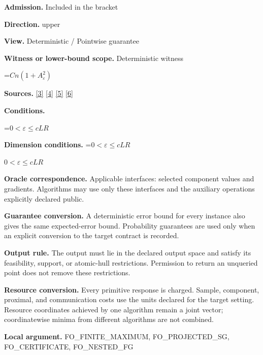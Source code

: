 \documentclass[10pt,a4paper]{article}
\newcommand{\AtlasMath}[1]{\par\begingroup\centering\setbox0=\hbox{$\displaystyle #1$}\ifdim\wd0>1.4\linewidth\typeout{ATLAS WIDE FORMULA: \the\wd0}\fi\ifdim\wd0>\linewidth\resizebox{\linewidth}{!}{\box0}\else\box0\fi\par\endgroup}
\newcommand{\AtlasInlineMath}[1]{\begingroup\setbox0=\hbox{$#1$}\ifdim\wd0>.4\linewidth\endgroup\AtlasMath{#1}\else\endgroup$#1$\fi}
\begin{document}
\textbf{Admission.} Included in the bracket



\textbf{Direction.} upper



\textbf{View.} Deterministic / Pointwise guarantee



\textbf{Witness or lower-bound scope.} Deterministic witness



\AtlasMath{Cn(1+A_\varepsilon^2)}


\textbf{Sources.} \href{https://arxiv.org/pdf/2311.10886}{[3]} \href{https://arxiv.org/pdf/1405.4980}{[4]} \href{https://www2.isye.gatech.edu/~nemirovs/MOR_AccuracyCertificates.pdf}{[5]} \href{https://arxiv.org/pdf/2609.20701}{[6]}



\textbf{Conditions.}
\AtlasMath{0<\varepsilon\le cLR}




\textbf{Dimension conditions.} \AtlasInlineMath{0<\varepsilon\le cLR}



\textbf{Oracle correspondence.} Applicable interfaces: selected component values and gradients. Algorithms may use only these interfaces and the auxiliary operations explicitly declared public.



\textbf{Guarantee conversion.} A deterministic error bound for every instance also gives the same expected-error bound. Probability guarantees are used only when an explicit conversion to the target contract is recorded.



\textbf{Output rule.} The output must lie in the declared output space and satisfy its feasibility, support, or atomic-hull restrictions. Permission to return an unqueried point does not remove these restrictions.



\textbf{Resource conversion.} Every primitive response is charged. Sample, component, proximal, and communication costs use the units declared for the target setting. Resource coordinates achieved by one algorithm remain a joint vector; coordinatewise minima from different algorithms are not combined.



\textbf{Local argument.} FO\_FINITE\_MAXIMUM, FO\_PROJECTED\_SG, FO\_CERTIFICATE, FO\_NESTED\_FG
\end{document}
